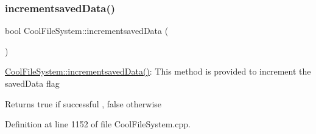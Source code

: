 \subsubsection{\texorpdfstring{incrementsaved\+Data()}{incrementsavedData()}}
{\footnotesize\ttfamily bool Cool\+File\+System\+::incrementsaved\+Data (\begin{DoxyParamCaption}{ }\end{DoxyParamCaption})}

\hyperlink{class_cool_file_system_aae045125288f255f3e258073dcada2a6}{Cool\+File\+System\+::incrementsaved\+Data()}\+: This method is provided to increment the saved\+Data flag

\begin{DoxyReturn}{Returns}
true if successful , false otherwise 
\end{DoxyReturn}


Definition at line 1152 of file Cool\+File\+System.\+cpp.


